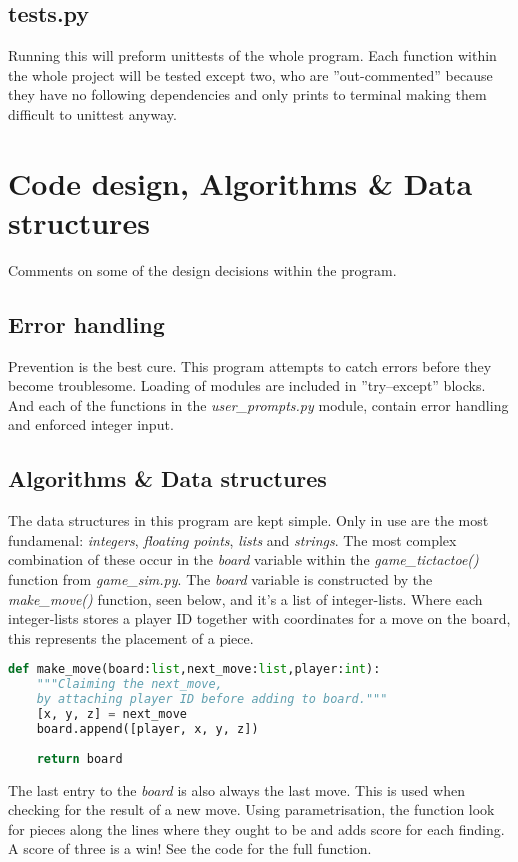 \documentclass[12pt,a4paper]{article}
\begin{document}
\subsection*{tests.py}
Running this will preform unittests of the whole program. Each function within the whole project will be tested except two, who are ''out-commented'' because they have no following dependencies and only prints to terminal making them difficult to unittest anyway.

\section{Code design, Algorithms \& Data structures}
Comments on some of the design decisions within the program. 
\subsection*{Error handling}
Prevention is the best cure. This program attempts to catch errors before they become troublesome. Loading of modules are included in ''try--except'' blocks. And each of the functions in the \emph{user\_prompts.py} module, contain error handling and enforced integer input.

\subsection*{Algorithms \& Data structures}
The data structures in this program are kept simple. Only in use are the most fundamenal: \emph{integers}, \emph{floating points}, \emph{lists} and \emph{strings}. The most complex combination of these occur in the \emph{board} variable within the \emph{game\_tictactoe()} function from \emph{game\_sim.py}. The \emph{board} variable is constructed by the \emph{make\_\-move()} function, seen below, and it's a list of integer-lists. Where each integer-lists stores a player ID together with coordinates for a move on the board, this represents the placement of a piece.

\begin{lstlisting}[language=Python, caption=game\_sim.py]
	def make_move(board:list,next_move:list,player:int):
    """Claiming the next_move,
    by attaching player ID before adding to board."""
    [x, y, z] = next_move
    board.append([player, x, y, z])
    
    return board
\end{lstlisting}

The last entry to the \emph{board} is also always the last move. This is used when checking for the result of a new move. Using parametrisation, the function look for pieces along the lines where they ought to be and adds score for each finding. A score of three is a win! See the code for the full function.
\end{document}
